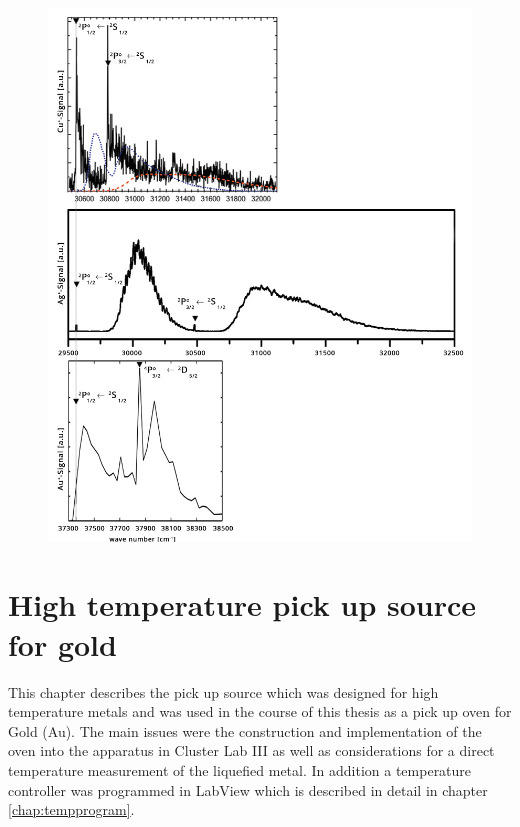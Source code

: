 \documentclass[parskip,12pt,headsepline,a4paper] {scrbook}
\begin{document}
\begin{figure}[ht]
\centerline{
\includegraphics[width=12cm]{./results/Cu_Ag_Au.jpg}}
\end{figure}


\chapter{High temperature pick up source for gold}
\label{chap:goldoven}
This chapter describes the pick up source which was designed for high temperature metals and was used in the course of this thesis as a pick up oven for Gold (Au). The main issues were the construction and implementation of the oven into the apparatus in Cluster Lab III as well as considerations for a direct temperature measurement of the liquefied metal. In addition a temperature controller was programmed in LabView which is described in detail in chapter \ref{chap:tempprogram}.
\end{document}

